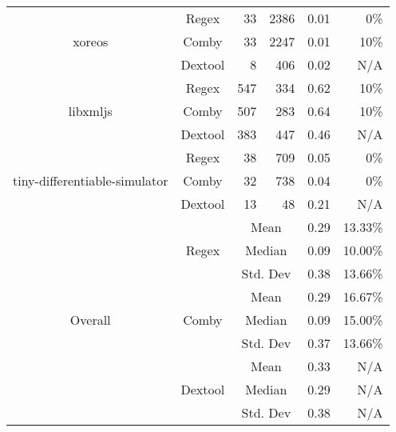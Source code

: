 \documentclass[sigconf,review, anonymous]{acmart}
\begin{document}
{\begin{table}[htbp]
{\begin{tabular}{|c|c|r|r|r|r|}
\multirow{3}{*}{\small xoreos} & Regex & 33 & 2386 & 0.01 & 0\% \\\cline{2-6}
    & Comby & 33 & 2247 & 0.01 & 10\% \\ \cline{2-6}
    & Dextool & 8 & 406 & 0.02 & N/A \\ \hline
\multirow{3}{*}{\small libxmljs} & Regex & 547 & 334 & 0.62 & 10\% \\\cline{2-6}
    & Comby & 507 & 283 & 0.64 & 10\% \\ \cline{2-6}
    & Dextool & 383 & 447 & 0.46 & N/A \\ \hline
\multirow{3}{*}{\small tiny-differentiable-simulator} & Regex & 38 & 709 & 0.05 & 0\% \\\cline{2-6}
    & Comby & 32 & 738 & 0.04 & 0\% \\ \cline{2-6}
    & Dextool & 13 & 48 & 0.21 & N/A\\ \hline
    
\multirow{9}{*}{Overall} & \multirow{3}{*}{Regex} & \multicolumn{2}{c|}{Mean} & 0.29  & 13.33\%\\\cline{3-6}
    &   &  \multicolumn{2}{c|}{Median} & 0.09 & 10.00\% \\\cline{3-6}
    &   &  \multicolumn{2}{c|}{Std. Dev} & 0.38 & 13.66\% \\\cline{2-6}

 & \multirow{3}{*}{Comby} & \multicolumn{2}{c|}{Mean} & 0.29 & 16.67\% \\\cline{3-6}
    &   &  \multicolumn{2}{c|}{Median} & 0.09 & 15.00\% \\\cline{3-6}
    &   &  \multicolumn{2}{c|}{Std. Dev} & 0.37 & 13.66\% \\\cline{2-6}

 & \multirow{3}{*}{Dextool} & \multicolumn{2}{c|}{Mean} & 0.33 & N/A\\\cline{3-6}
    &   &  \multicolumn{2}{c|}{Median} & 0.29 & N/A \\\cline{3-6}
    &   &  \multicolumn{2}{c|}{Std. Dev} & 0.38 & N/A \\ \hline
    
    
\end{tabular}
}
\end{table}


\begin{table}[htbp]
\centering
\caption{Java (Our Implementation vs. PIT vs. LittleDarwin)}
\label{tab:table_java2}
\end{table}}
\end{document}
